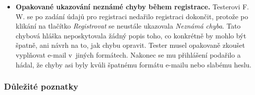 \begin{itemize}
\item\textbf{Opakované ukazování neznámé chyby během registrace.} Testerovi F. W. se po zadání údajů pro registraci nedařilo registraci dokončit, protože po klikání na tlačítko \emph{Registrovat} se neustále ukazovala \emph{Neznámá chyba}. Tato chybová hláška neposkytovala žádný popis toho, co konkrétně by mohlo být špatně, ani návrh na to, jak chybu opravit. Tester musel opakovaně zkoušet vyplňovat e-mail v~jiných formátech. Nakonec se mu přihlášení podařilo a hádal, že chyby asi byly kvůli špatnému formátu e-mailu nebo slabému heslu.
\end{itemize}

\subsubsection{Důležité poznatky}

